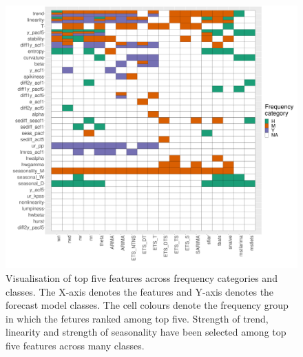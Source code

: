 \documentclass[11pt,a4paper,]{article}
\begin{document}
\begin{figure}[h]

{\centering \includegraphics[width=\textwidth]{figure/viplot-1} 

}

\caption{Visualisation  of top five features across frequency categories and classes. The X-axis denotes the features and Y-axis denotes the forecast model classes. The cell colours denote the frequency group in which the fetures ranked among top five. Strength of trend, linearity and strength of seasonality have been selected among top five features across many classes.}\label{fig:viplot}
\end{figure}
\end{document}
